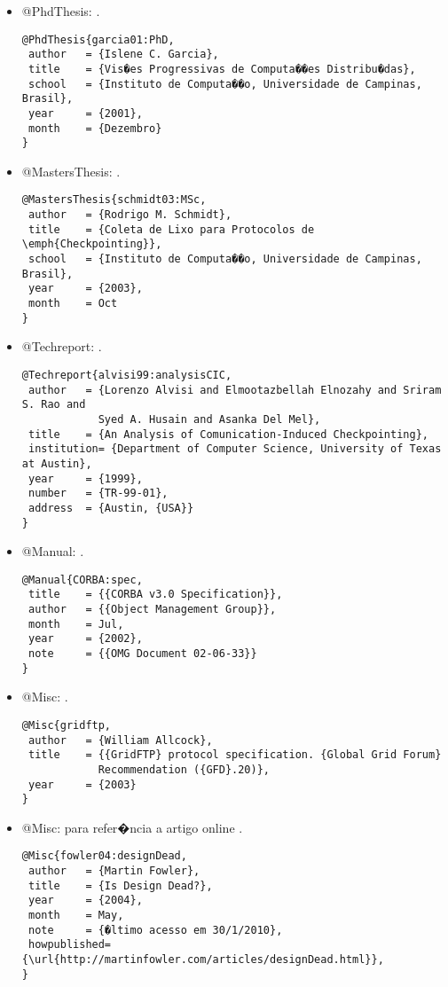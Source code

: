 \begin{itemize}
\item @PhdThesis: \citep{garcia01:PhD}.
{\scriptsize\begin{verbatim}
@PhdThesis{garcia01:PhD,
 author   = {Islene C. Garcia},
 title    = {Vis�es Progressivas de Computa��es Distribu�das},
 school   = {Instituto de Computa��o, Universidade de Campinas, Brasil},
 year     = {2001},
 month    = {Dezembro}
}
\end{verbatim}}

\item @MastersThesis: \citep{schmidt03:MSc}.
{\scriptsize\begin{verbatim}
@MastersThesis{schmidt03:MSc,
 author   = {Rodrigo M. Schmidt},
 title    = {Coleta de Lixo para Protocolos de \emph{Checkpointing}},
 school   = {Instituto de Computa��o, Universidade de Campinas, Brasil},
 year     = {2003},
 month    = Oct
}
\end{verbatim}}

\item @Techreport: \citep{alvisi99:analysisCIC}.
{\scriptsize\begin{verbatim}
@Techreport{alvisi99:analysisCIC,
 author   = {Lorenzo Alvisi and Elmootazbellah Elnozahy and Sriram S. Rao and
            Syed A. Husain and Asanka Del Mel},
 title    = {An Analysis of Comunication-Induced Checkpointing},
 institution= {Department of Computer Science, University of Texas at Austin},
 year     = {1999},
 number   = {TR-99-01},
 address  = {Austin, {USA}}
}
\end{verbatim}}

\item @Manual: \citep{CORBA:spec}.
{\scriptsize\begin{verbatim}
@Manual{CORBA:spec,
 title    = {{CORBA v3.0 Specification}},
 author   = {{Object Management Group}},
 month    = Jul,
 year     = {2002},
 note     = {{OMG Document 02-06-33}}
}
\end{verbatim}}

\item @Misc: \citep{gridftp}.
{\scriptsize\begin{verbatim}
@Misc{gridftp,
 author   = {William Allcock},
 title    = {{GridFTP} protocol specification. {Global Grid Forum}
            Recommendation ({GFD}.20)},
 year     = {2003}
}
\end{verbatim}}

\item @Misc: para refer�ncia a artigo online \citep{fowler04:designDead}.
{\scriptsize\begin{verbatim}
@Misc{fowler04:designDead,
 author   = {Martin Fowler},
 title    = {Is Design Dead?},
 year     = {2004},
 month    = May,
 note     = {�ltimo acesso em 30/1/2010},
 howpublished= {\url{http://martinfowler.com/articles/designDead.html}},
}
\end{verbatim}}


\end{itemize}
